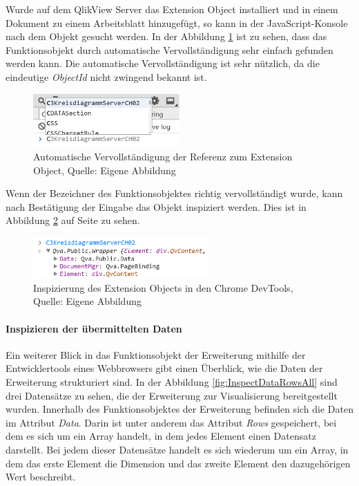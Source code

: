 Wurde auf dem QlikView Server das Extension Object installiert und in einem Dokument zu einem Arbeitsblatt hinzugefügt, so kann in der JavaScript-Konsole nach dem Objekt gesucht werden. In der Abbildung \ref{fig:AutoCompl} ist zu sehen, dass das Funktionsobjekt durch automatische Vervollständigung sehr einfach gefunden werden kann. Die automatische Vervollständigung ist sehr nützlich, da die eindeutige \textit{ObjectId} nicht zwingend bekannt ist.

\begin{figure}[htbp]
	\centering
		\includegraphics[width=0.50\textwidth]{./img/DevTools/AutoCompl.png}
	\caption[Automatische Vervollständigung der Referenz zum Extension Object]{Automatische Vervollständigung der Referenz zum Extension Object, Quelle: Eigene Abbildung}
	\label{fig:AutoCompl}
\end{figure}


Wenn der Bezeichner des Funktionsobjektes richtig vervollständigt wurde, kann nach Bestätigung der Eingabe das Objekt inspiziert werden. Dies ist in Abbildung \ref{fig:InspectExtensionObject} auf Seite \pageref{fig:InspectExtensionObject} zu sehen.

\begin{figure}[htbp]
	\centering
		\includegraphics[width=0.60\textwidth]{./img/DevTools/Inspect.png}
	\caption[Inspizierung des Extension Objects in den Chrome DevTools]{Inspizierung des Extension Objects in den Chrome DevTools, \\Quelle: Eigene Abbildung}
	\label{fig:InspectExtensionObject}
\end{figure}


\paragraph{Inspizieren der übermittelten Daten}
\label{lab:InspizierenDerUebermitteltenDaten} 

Ein weiterer Blick in das Funktionsobjekt der Erweiterung mithilfe der Entwicklertools eines Webbrowsers gibt einen Überblick, wie die Daten der Erweiterung strukturiert sind. In der Abbildung \ref{fig:InspectDataRowsAll} sind drei Daten\-sätze zu sehen, die der Erweiterung zur Visualisierung bereitgestellt wurden. Innerhalb des Funktionsobjektes der Erweiterung befinden sich die Daten im Attribut \textit{Data}. Darin ist unter anderem das Attribut \textit{Rows} gespeichert, bei dem es sich um ein Array handelt, in dem jedes Element einen Daten\-satz darstellt. Bei jedem dieser Daten\-sätze handelt es sich wiederum um ein Array, in dem das erste Element die Dimension und das zweite Element den dazugehörigen Wert beschreibt.

